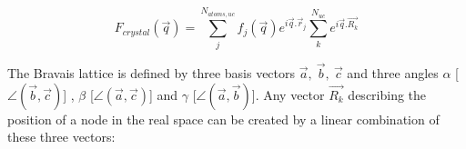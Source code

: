 \begin{equation}
    F_{crystal}(\vec{q}) = \sum_j^{N_{atoms,uc}} f_j(\vec{q}) e^{i\vec{q}.\vec{r}_j} \sum_k^{N_{uc}} e^{i\vec{q}.\vec{R_k}}
    \label{eq:Fcrystal}
\end{equation}







The Bravais lattice is defined by three basis vectors $\vec{a},\ \vec{b},\ \vec{c}$ and three angles $\alpha$ [$\angle (\vec{b}, \vec{c})$] , $\beta$ [$\angle (\vec{a}, \vec{c})$] and $\gamma$ [$\angle (\vec{a}, \vec{b})$].
Any vector $\vec{R_k}$ describing the position of a node in the real space can be created by a linear combination of these three vectors:

